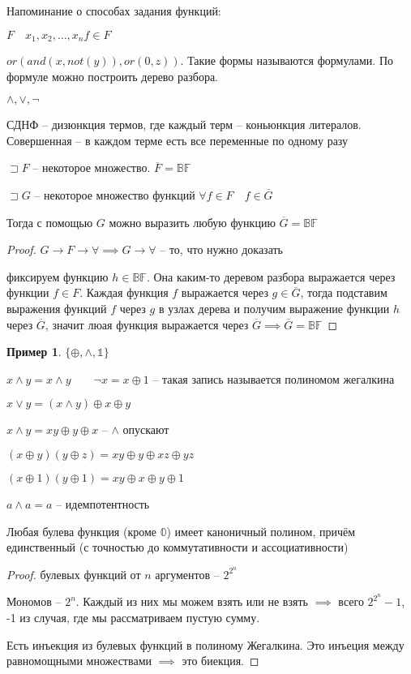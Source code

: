 \documentclass{book}
\theoremstyle{definition}
\newtheorem*{example}{Пример}
\begin{document}
    Напоминание о способах задания функций:

    $F\quad x_1, x_2, \ldots ,x_{n} f\in F$

    $or(and(x, not(y)),or(0,z))$. Такие формы называются формулами. По формуле можно построить дерево разбора.

    $\land, \lor, \neg$ 

    СДНФ -- дизюнкция термов, где каждый терм -- коньюнкция литералов. Совершенная --  в каждом терме есть все переменные по одному разу

    \begin{lemma}
        $\sqsupset F$ -- некоторое множество. $\overline{F} = \mathbb{BF}$

        $\sqsupset G$ -- некоторое множество функций $\forall f\in F\quad f\in \overline{G}$

        Тогда с помощью $G$ можно выразить любую функцию $\overline{G} = \mathbb{BF}$
    \end{lemma}
    \begin{proof}
        $G\to F\to \forall  \implies G\to \forall $ -- то, что нужно доказать

        фиксируем функцию $h\in \mathbb{BF}$. Она каким-то деревом разбора выражается через функции $f\in F$. Каждая функция $f$ выражается через $g\in \overline{G}$, тогда подставим выражения функций $f$ через $g$  в узлах дерева и получим выражение функции $h$ через $\overline{G}$, значит люая функция выражается через $\overline{G} \implies \overline{G} = \mathbb{BF}$ 
    \end{proof}

    \begin{example}
        $\{\oplus, \land, \mathbb{1}\}$

        $x\land y = x\land y\qquad \neg x = x\oplus 1$ -- такая запись называется полиномом жегалкина

        $x\lor y = (x\land y)\oplus x\oplus y$
    \end{example}

    $x\land y = xy\oplus y\oplus x$ -- $\land$ опускают

    $(x\oplus y)(y\oplus z) = xy\oplus y\oplus xz\oplus yz$

    $(x\oplus 1)(y\oplus 1) = xy\oplus x\oplus y\oplus 1$

    $a\land a = a$ -- идемпотентность 

    \begin{theorem}
        Любая булева функция (кроме $\mathbb{0}$) имеет каноничный полином, причём единственный (с точностью до коммутативности и ассоциативности)
    \end{theorem}
    \begin{proof}
        булевых функций от $n$ аргументов -- $2^{2^n}$

        Мономов -- $2^n$. Каждый из них мы можем взять или не взять $\implies $ всего $2^{2^n}-1$, -1 из случая, где мы рассматриваем пустую сумму.

        Есть инъекция из булевых функций в полиному Жегалкина. Это инъеция между равномощными множествами $\implies $ это биекция.
    \end{proof}
\end{document}
